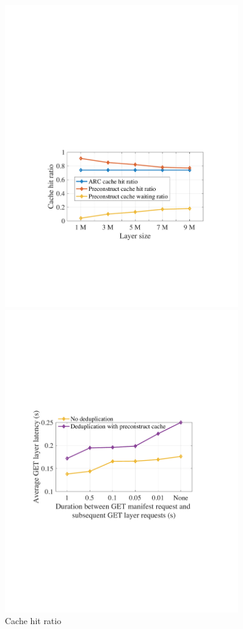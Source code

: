 \begin{figure}[t]
\begin{minipage}{0.3\textwidth}
		\includegraphics[width=0.9\textwidth]{graphs/cachehitratio.pdf}
		\caption{Cache hit ratio}%
		\label{fig:eval-cachehitratios}
	\end{minipage}%
	\begin{minipage}{0.3\textwidth}
	\centering
	\includegraphics[width=0.9\textwidth]{graphs/durationML.pdf}

\end{minipage}
\end{figure}
